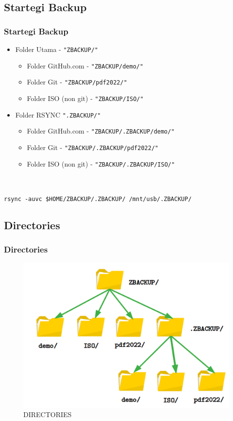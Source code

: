 \documentclass[xcolor=table, notheorems, hyperref={pdfpagelabels=false}]{beamer}
\begin{document}
\begin{frame}[fragile]
\section{Startegi Backup}
\frametitle{Startegi Backup}
\begin{itemize}
\item Folder Utama - \texttt{"ZBACKUP/"}
\begin{itemize}
\item Folder GitHub.com - \texttt{"ZBACKUP/demo/"}
\item Folder Git - \texttt{"ZBACKUP/pdf2022/"}
\item Folder ISO (non git) - \texttt{"ZBACKUP/ISO/"}
\end{itemize}
\item Folder RSYNC \texttt{".ZBACKUP/"}
\begin{itemize}
\item Folder GitHub.com - \texttt{"ZBACKUP/.ZBACKUP/demo/"}
\item Folder Git - \texttt{"ZBACKUP/.ZBACKUP/pdf2022/"}
\item Folder ISO (non git) - \texttt{"ZBACKUP/.ZBACKUP/ISO/"}
\end{itemize}
\end{itemize}
\begin{lstlisting}[basicstyle=\ttfamily\large]


rsync -auvc $HOME/ZBACKUP/.ZBACKUP/ /mnt/usb/.ZBACKUP/

\end{lstlisting}
\end{frame}

\begin{frame}[fragile]
\section{Directories}
\frametitle{Directories}
\begin{figure}
\includegraphics[width=0.69\linewidth]{DIRECTORIES}
\caption{DIRECTORIES}
\end{figure}
\end{frame}
\end{document}
